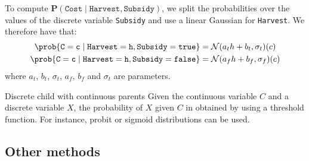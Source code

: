 \begin{description}
\begin{descriptionlist}
\begin{example}
                    To compute $\textbf{P}(\texttt{Cost} \mid \texttt{Harvest}, \texttt{Subsidy})$,
                    we split the probabilities over the values of the discrete variable \texttt{Subsidy}
                    and use a linear Gaussian for \texttt{Harvest}.
                    We therefore have that:
                    \[ 
                        \begin{split}
                            \prob{\texttt{C} = \texttt{c} \mid \texttt{Harvest} = \texttt{h}, \texttt{Subsidy} = \texttt{true}} 
                            &= \mathcal{N}(a_t h + b_t, \sigma_t)(c) \\
                            \prob{\texttt{C} = \texttt{c} \mid \texttt{Harvest} = \texttt{h}, \texttt{Subsidy} = \texttt{false}} 
                            &= \mathcal{N}(a_f h + b_f, \sigma_f)(c)
                        \end{split}
                    \]
                    where $a_t$, $b_t$, $\sigma_t$, $a_f$, $b_f$ and $\sigma_t$ are parameters.
                \end{example}

            \item[Discrete child with continuous parents] 
                Given the continuous variable $C$ and a discrete variable $X$,
                the probability of $X$ given $C$ in obtained by using a threshold function.
                For instance, probit or sigmoid distributions can be used.
        \end{descriptionlist}
\end{description}


\subsection{Other methods}

